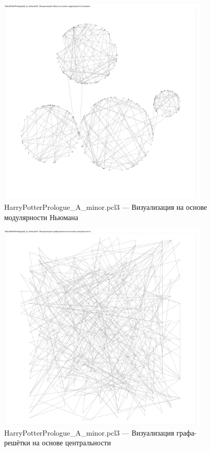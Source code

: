 \documentclass[a4paper,oneside,14pt]{extarticle}
\begin{document}
\begin{figure}[H]
	\centering
	\includegraphics[width=0.9\textwidth]{img/harrypotter-newmann.pdf}
	\caption{HarryPotterPrologue\_A\_minor.pcl3 --- Визуализация на основе модулярности Ньюмана}
	\label{fig:}
\end{figure}

\begin{figure}[H]
	\centering
	\includegraphics[width=0.9\textwidth]{img/harrypotter-lattice.pdf}
	\caption{HarryPotterPrologue\_A\_minor.pcl3 --- Визуализация графа-решётки на основе центральности}
	\label{fig:}
\end{figure}
\end{document}
